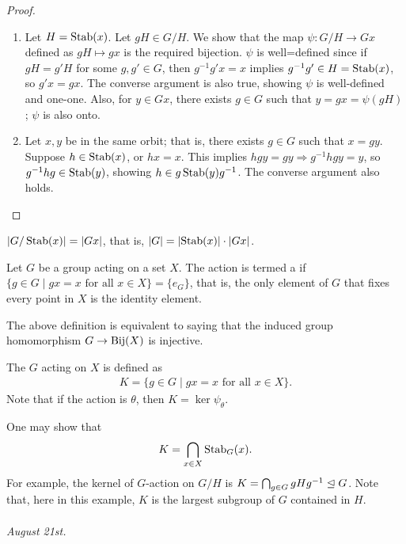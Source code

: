 \begin{proof}
    \begin{enumerate}
        \item Let $H = \operatorname{Stab}(x)$. Let $gH \in G/H$. We show that the map $\psi:G/H \to Gx$ defined as $gH \mapsto gx$ is the required bijection. $\psi$ is well=defined since if $gH = g'H$ for some $g,g' \in G$, then $g^{-1}g'x = x$ implies $g^{-1}g' \in H = \operatorname{Stab}(x)$, so $g'x = gx$. The converse argument is also true, showing $\psi$ is well-defined and one-one. Also, for $y \in Gx$, there exists $g \in G$ such that $y = gx = \psi(gH)$; $\psi$ is also onto.

        \item Let $x,y$ be in the same orbit; that is, there exists $g \in G$ such that $x = gy$. Suppose $h \in \operatorname{Stab}(x)$, or $hx = x$. This implies $hgy = gy \Rightarrow g^{-1}hgy = y$, so $g^{-1}hg \in \operatorname{Stab}(y)$, showing $h \in g\operatorname{Stab}(y)g^{-1}$. The converse argument also holds.
    \end{enumerate}
\end{proof}


\begin{corollary}
    $\left| G/\operatorname{Stab}(x) \right| = \left| Gx \right|$, that is, $\left| G \right| = \left| \operatorname{Stab}(x) \right| \cdot \left| Gx \right|$.
\end{corollary}


\begin{definition}
    Let $G$ be a group acting on a set $X$. The action is termed a  if $\{g \in G \mid gx = x \text{ for all } x \in X\} = \{e_{G}\}$, that is, the only element of $G$ that fixes every point in $X$ is the identity element.
\end{definition}
The above definition is equivalent to saying that the induced group homomorphism $G \to \operatorname{Bij}(X)$ is injective.

\begin{definition}
    The  $G$ acting on $X$ is defined as
    \begin{align}
        K = \{g \in G \mid gx = x \text{ for all } x \in X\}.
    \end{align}
    Note that if the action is $\theta$, then $K = \ker \psi_{\theta}$.
\end{definition}

\noindent One may show that
\begin{align}
    K = \bigcap_{x \in X} \operatorname{Stab}_{G}(x).
\end{align}
For example, the kernel of $G$-action on $G/H$ is $K = \bigcap _{g \in G} gHg^{-1} \trianglelefteq G$. Note that, here in this example, $K$ is the largest subgroup of $G$ contained in $H$.\\ \\
\textit{August 21st.}

